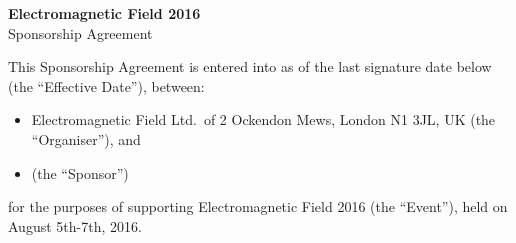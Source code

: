

\selectfont

\begin{center}
{\bf \LARGE Electromagnetic Field 2016}\\[12pt]
{\Large Sponsorship Agreement}
\end{center}

This Sponsorship Agreement is entered into as of the last signature date below (the ``Effective Date''), between:
\begin{itemize}
    \item Electromagnetic Field Ltd.\ of 2 Ockendon Mews, London N1 3JL, UK (the ``Organiser''), and
    \item <sponsor name and address> (the ``Sponsor'')
\end{itemize}

for the purposes of supporting Electromagnetic Field 2016 (the ``Event''), held on August 5th-7th, 2016.

